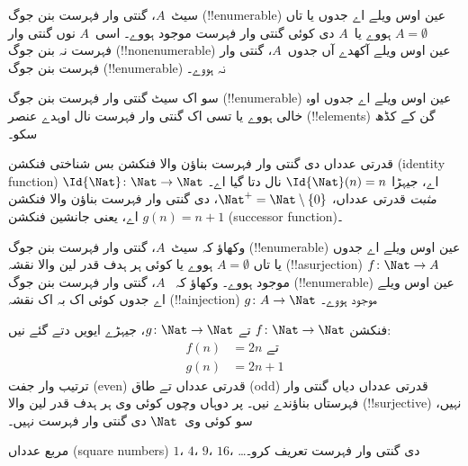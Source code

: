 \documentclass[../../../include/open-logic-section]{subfiles}
\begin{document}
\begin{defn}
  سیٹ~$A$، گنتی وار فہرست بنن جوگ (!!{enumerable}) عین اوس ویلے اے جدوں یا تاں
  $A = \emptyset$ ہووے یا~$A$ دی کوئی گنتی وار فہرست موجود ہووے۔
  اسی~$A$ نوں گنتی وار فہرست نہ بنن جوگ (!!{nonenumerable}) عین اوس
  ویلے آکھدے آں جدوں~$A$، گنتی وار فہرست بنن جوگ (!!{enumerable}) نہ
  ہووے۔
\end{defn}

\begin{explain}
سو اک سیٹ گنتی وار فہرست بنن جوگ (!!{enumerable}) عین اوس ویلے اے
جدوں اوہ خالی ہووے یا تسی اک گنتی وار فہرست نال اوہدے عنصر
(!!{element}s) گن کے کڈھ سکو۔
\end{explain}

\begin{ex}
قدرتی عدداں دی گنتی وار فہرست بناؤن والا فنکشن بس شناختی فنکشن
(identity function)
$\Id{\Nat} \colon \Nat \to \Nat$ اے، جیہڑا $\Id{\Nat}(n) = n$ نال
دتا گیا اے۔ \emph{مثبت} قدرتی عدداں، $\Nat^+ =
\Nat \setminus \{0\}$، دی گنتی وار فہرست بناؤن والا فنکشن
$g(n) = n + 1$ اے، یعنی جانشین فنکشن (successor function)۔
\end{ex}

\begin{prob}
وکھاؤ کہ سیٹ~$A$، گنتی وار فہرست بنن جوگ (!!{enumerable}) عین اوس
ویلے اے جدوں یا تاں $A = \emptyset$ ہووے یا کوئی ہر ہدف قدر لین والا
نقشہ (!!a{surjection}) $f\colon \Nat \to A$ موجود ہووے۔ وکھاؤ کہ
~$A$، گنتی وار فہرست بنن جوگ (!!{enumerable}) عین اوس ویلے اے جدوں
کوئی اک بہ اک نقشہ (!!a{injection}) $g\colon A \to \Nat$ موجود ہووے۔
\end{prob}

\begin{ex}
فنکشن $f\colon \Nat \to \Nat$ تے $g \colon \Nat \to \Nat$، جیہڑے
ایویں دتے گئے نیں:
\begin{align*}
  f(n) & = 2n \text{ تے}\\
  g(n) & = 2n+1
\end{align*}
ترتیب وار جفت (even) قدرتی عدداں تے طاق (odd) قدرتی عدداں دیاں گنتی
وار فہرستاں بناؤندے نیں۔ پر دوہاں وچوں کوئی وی ہر ہدف قدر لین والا
(!!{surjective}) نہیں، سو کوئی وی~$\Nat$ دی گنتی وار فہرست نہیں۔
\end{ex}

\begin{prob}
مربع عدداں (square numbers) $1$، $4$، $9$، $16$، \dots دی گنتی وار
فہرست تعریف کرو۔
\end{prob}
\end{document}
